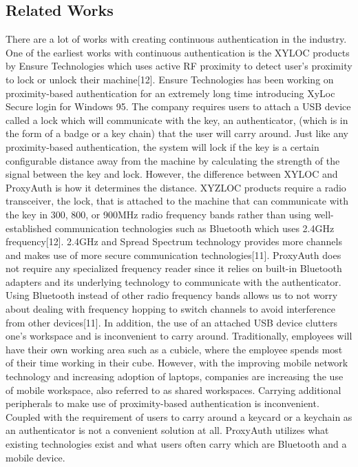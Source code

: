 \documentclass[letterpaper,twocolumn,10pt]{article}
\begin{document}
\subsection{Related Works} 
There are a lot of works with creating continuous authentication in the industry. One of the earliest works with continuous authentication is the XYLOC products by Ensure Technologies which uses active RF proximity to detect user's proximity to lock or unlock their machine[12]. Ensure Technologies has been working on proximity-based authentication for an extremely long time introducing XyLoc Secure login for Windows 95. The company requires users to attach a USB device called a lock which will communicate with the key, an authenticator, (which is in the form of a badge or a key chain) that the user will carry around. Just like any proximity-based authentication, the system will lock if the key is a certain configurable distance away from the machine by calculating the strength of the signal between the key and lock. However, the difference between XYLOC and ProxyAuth is how it determines the distance. XYZLOC products require a radio transceiver, the lock, that is attached to the machine that can communicate with the key in 300, 800, or 900MHz radio frequency bands rather than using well-established communication technologies such as Bluetooth which uses 2.4GHz frequency[12]. 2.4GHz and Spread Spectrum technology provides more channels and makes use of more secure communication technologies[11]. ProxyAuth does not require any specialized frequency reader since it relies on built-in Bluetooth adapters and its underlying technology to communicate with the authenticator. Using Bluetooth instead of other radio frequency bands allows us to not worry about dealing with frequency hopping to switch channels to avoid interference from other devices[11]. In addition, the use of an attached USB device clutters one's workspace and is inconvenient to carry around. Traditionally, employees will have their own working area such as a cubicle, where the employee spends most of their time working in their cube. However, with the improving mobile network technology and increasing adoption of laptops, companies are increasing the use of mobile workspace, also referred to as shared workspaces. Carrying additional peripherals to make use of proximity-based authentication is inconvenient. Coupled with the requirement of users to carry around a keycard or a keychain as an authenticator is not a convenient solution at all. ProxyAuth utilizes what existing technologies exist and what users often carry which are Bluetooth and a mobile device.
\end{document}
